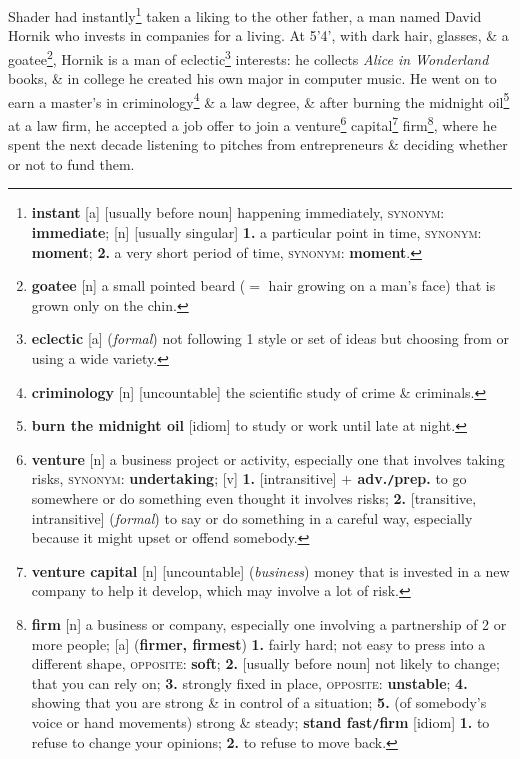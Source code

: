 \documentclass[oneside]{book}
\numberwithin{equation}{section}
\begin{document}
Shader had instantly\footnote{\textbf{instant} [a] [usually before noun] happening immediately, \textsc{synonym}: \textbf{immediate}; [n] [usually singular] \textbf{1.} a particular point in time, \textsc{synonym}: \textbf{moment}; \textbf{2.} a very short period of time, \textsc{synonym}: \textbf{moment}.} taken a liking to the other father, a man named David Hornik who invests in companies for a living. At 5'4', with dark hair, glasses, \& a goatee\footnote{\textbf{goatee} [n] a small pointed beard ($=$ hair growing on a man's face) that is grown only on the chin.}, Hornik is a man of eclectic\footnote{\textbf{eclectic} [a] (\textit{formal}) not following 1 style or set of ideas but choosing from or using a wide variety.} interests: he collects \textit{Alice in Wonderland} books, \& in college he created his own major in computer music. He went on to earn a master's in criminology\footnote{\textbf{criminology} [n] [uncountable] the scientific study of crime \& criminals.} \& a law degree, \& after burning the midnight oil\footnote{\textbf{burn the midnight oil} [idiom] to study or work until late at night.} at a law firm, he accepted a job offer to join a venture\footnote{\textbf{venture} [n] a business project or activity, especially one that involves taking risks, \textsc{synonym}: \textbf{undertaking}; [v] \textbf{1.} [intransitive] \textbf{$+$ adv.\texttt{/}prep.} to go somewhere or do something even thought it involves risks; \textbf{2.} [transitive, intransitive] (\textit{formal}) to say or do something in a careful way, especially because it might upset or offend somebody.} capital\footnote{\textbf{venture capital} [n] [uncountable] (\textit{business}) money that is invested in a new company to help it develop, which may involve a lot of risk.} firm\footnote{\textbf{firm} [n] a business or company, especially one involving a partnership of 2 or more people; [a] (\textbf{firmer, firmest}) \textbf{1.} fairly hard; not easy to press into a different shape, \textsc{opposite}: \textbf{soft}; \textbf{2.} [usually before noun] not likely to change; that you can rely on; \textbf{3.} strongly fixed in place, \textsc{opposite}: \textbf{unstable}; \textbf{4.} showing that you are strong \& in control of a situation; \textbf{5.} (of somebody's voice or hand movements) strong \& steady; \textbf{stand fast\texttt{/}firm} [idiom] \textbf{1.} to refuse to change your opinions; \textbf{2.} to refuse to move back.}, where he spent the next decade listening to pitches from entrepreneurs \& deciding whether or not to fund them.
\end{document}
